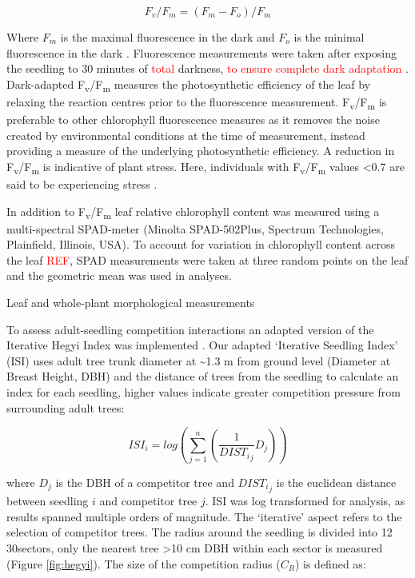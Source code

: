 \documentclass[a4paper,11pt]{article}
\newcommand{\todo}[1]{\textcolor{red}{#1}}   %
\begin{document}
\begin{equation} \label{eq:fvfm}
F_v/F_m = (F_m - F_o)/F_m
\end{equation}

Where $F_m$ is the maximal fluorescence in the dark and $F_o$ is the minimal fluorescence in the dark \citep{Maxwell2000}. Fluorescence measurements were taken after exposing the seedling to 30 minutes of \todo{total} darkness, \todo{to ensure complete dark adaptation} \citep{Campbell2007}. Dark-adapted F\textsubscript{v}/F\textsubscript{m} measures the photosynthetic efficiency of the leaf by relaxing the reaction centres prior to the fluorescence measurement. F\textsubscript{v}/F\textsubscript{m} is preferable to other chlorophyll fluorescence measures as it removes the noise created by environmental conditions at the time of measurement, instead providing a measure of the underlying photosynthetic efficiency. A reduction in F\textsubscript{v}/F\textsubscript{m} is indicative of plant stress. Here, individuals with F\textsubscript{v}/F\textsubscript{m} values <0.7 are said to be experiencing stress \citep{Maxwell2000}. 

In addition to F\textsubscript{v}/F\textsubscript{m} leaf relative chlorophyll content was measured using a multi-spectral SPAD-meter (Minolta SPAD-502Plus, Spectrum Technologies, Plainfield, Illinois, USA). To account for variation in chlorophyll content across the leaf \todo{REF}, SPAD measurements were taken at three random points on the leaf and the geometric mean was used in analyses. 

Leaf and whole-plant morphological measurements 

To assess adult-seedling competition interactions an adapted version of the Iterative Hegyi Index was implemented \citep{Hegyi1974, Lee2004, Seifert2014}. Our adapted `Iterative Seedling Index' (ISI) uses adult tree trunk diameter at \textasciitilde 1.3 m from ground level  (Diameter at Breast Height, DBH) and the distance of trees from the seedling to calculate an index for each seedling, higher values indicate greater competition pressure from surrounding adult trees:

\begin{equation}
\label{eq:ISI}
ISI_i = log(\sum_{j=1}^n (\frac{1}{{DIST_i}_j} D_j))
\end{equation}

where $D_j$ is the DBH of a competitor tree and ${{DIST_i}_j}$ is the euclidean distance between seedling $i$ and competitor tree $j$. ISI was log transformed for analysis, as results spanned multiple orders of magnitude. The `iterative' aspect refers to the selection of competitor trees. The radius around the seedling is divided into 12 30\textdegree  sectors, only the nearest tree >10 cm DBH within each sector is measured (Figure \ref{fig:hegyi}). The size of the competition radius ($C_R$) is defined as:
\end{document}
